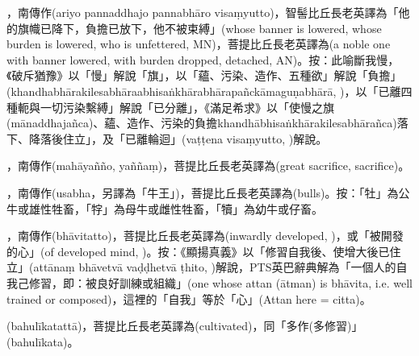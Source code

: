 \startitemgroup[noteitems]
\item{}，南傳作(ariyo pannaddhajo pannabhāro visaṃyutto)，智髻比丘長老英譯為「他的旗幟已降下，負擔已放下，他不被束縛」(whose banner is lowered, whose burden is lowered, who is unfettered, MN)，菩提比丘長老英譯為(a noble one with banner lowered, with burden dropped, detached, AN)。按：此喻斷我慢，《破斥猶豫》以「慢」解說「旗」，以「蘊、污染、造作、五種欲」解說「負擔」(khandhabhārakilesabhāraabhisaṅkhārabhārapañckāmaguṇabhārā, )，以「已離四種軛與一切污染繫縛」解說「已分離」，《滿足希求》以「使慢之旗(mānaddhajañca)、蘊、造作、污染的負擔khandhābhisaṅkhārakilesabhārañca)落下、降落後住立」，及「已離輪迴」(vaṭṭena visaṃyutto, )解說。
\stopitemgroup

\startitemgroup[noteitems]
\item{}，南傳作(mahāyañño, yaññaṃ)，菩提比丘長老英譯為(great sacrifice, sacrifice)。
\stopitemgroup

\startitemgroup[noteitems]
\item{}，南傳作(usabha，另譯為「牛王」)，菩提比丘長老英譯為(bulls)。按：「牡」為公牛或雄性牲畜，「牸」為母牛或雌性牲畜，「犢」為幼牛或仔畜。
\stopitemgroup

\startitemgroup[noteitems]
\item{}，南傳作(bhāvitatto)，菩提比丘長老英譯為(inwardly developed, )，或「被開發的心」(of developed mind, )。按：《顯揚真義》以「修習自我後、使增大後已住立」(attānaṃ bhāvetvā vaḍḍhetvā ṭhito, )解說，PTS英巴辭典解為「一個人的自我己修習，即：被良好訓練或組織」(one whose attan (ātman) is bhāvita, i.e. well trained or composed)，這裡的「自我」等於「心」(Attan here = citta)。
\item{}(bahulīkatattā)，菩提比丘長老英譯為(cultivated)，同「多作(多修習)」(bahulīkata)。
\stopitemgroup

